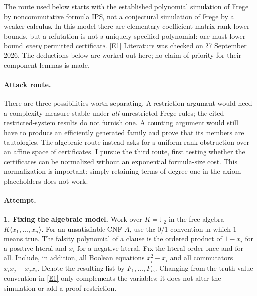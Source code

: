 \documentclass[11pt,a4paper]{article}
\newcommand{\eref}[2]{\hyperlink{extra:#1:#2}{[E#2]}}
\numberwithin{equation}{section}
\begin{document}
The route used below starts with the established polynomial simulation of
Frege by noncommutative formula IPS, not a conjectural simulation of Frege by a
weaker calculus. In this model there are elementary coefficient-matrix rank
lower bounds, but a refutation is not a uniquely specified polynomial:
one must lower-bound \emph{every} permitted certificate.
\eref{statement}{1} Literature was checked on 27 September 2026. The deductions below
are worked out here; no claim of priority for their component lemmas is made.

\paragraph{Attack route.}
There are three possibilities worth separating. A restriction argument would
need a complexity measure stable under \emph{all} unrestricted Frege rules;
the cited restricted-system results do not furnish one. A counting argument
would still have to produce an efficiently generated family and prove that
its members are tautologies. The algebraic route instead asks for a uniform
rank obstruction over an affine space of certificates. I pursue the third
route, first testing whether the certificates can be normalized without an
exponential formula-size cost. This normalization is important: simply
retaining terms of degree one in the axiom placeholders does not work.

\paragraph{Attempt.}
\textbf{1. Fixing the algebraic model.}
Work over $K=\mathbb F_2$ in the free algebra $K\langle x_1,\ldots,x_n\rangle$.
For an unsatisfiable CNF $A$, use the $0/1$ convention in which $1$ means true.
The falsity polynomial of a clause is the ordered product of $1-x_i$ for a
positive literal and $x_i$ for a negative literal. Fix the literal order once
and for all. Include, in addition, all Boolean equations $x_i^2-x_i$ and all
commutators $x_ix_j-x_jx_i$. Denote the resulting list by $F_1,\ldots,F_m$.
Changing from the truth-value convention in \eref{statement}{1} only complements the
variables; it does not alter the simulation or add a proof restriction.
\end{document}
